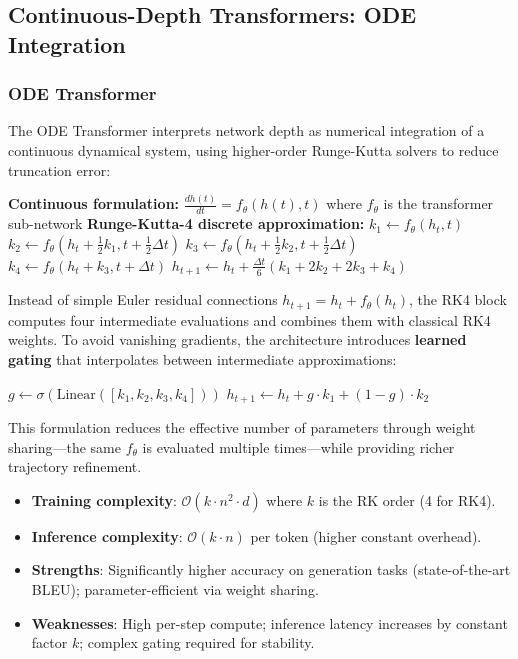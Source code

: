 \subsection{Continuous-Depth Transformers: ODE Integration}

\subsubsection{ODE Transformer}
The ODE Transformer \citep{zhang_continuous_2021} interprets network depth as numerical integration of a continuous dynamical system, using higher-order Runge-Kutta solvers to reduce truncation error:

\begin{algorithmic}[1]
\State \textbf{Continuous formulation:} $\frac{dh(t)}{dt} = f_\theta(h(t), t)$ where $f_\theta$ is the transformer sub-network
\State \textbf{Runge-Kutta-4 discrete approximation:}
\State $k_1 \gets f_\theta(h_t, t)$
\State $k_2 \gets f_\theta(h_t + \tfrac{1}{2}k_1, t + \tfrac{1}{2}\Delta t)$
\State $k_3 \gets f_\theta(h_t + \tfrac{1}{2}k_2, t + \tfrac{1}{2}\Delta t)$
\State $k_4 \gets f_\theta(h_t + k_3, t + \Delta t)$
\State $h_{t+1} \gets h_t + \frac{\Delta t}{6}(k_1 + 2k_2 + 2k_3 + k_4)$ 
\end{algorithmic}

Instead of simple Euler residual connections $h_{t+1} = h_t + f_\theta(h_t)$, the RK4 block computes four intermediate evaluations and combines them with classical RK4 weights. To avoid vanishing gradients, the architecture introduces \textbf{learned gating} that interpolates between intermediate approximations:

\begin{algorithmic}[1]
\State $g \gets \sigma(\text{Linear}([k_1, k_2, k_3, k_4]))$ 
\State $h_{t+1} \gets h_t + g \cdot k_1 + (1-g) \cdot k_2$ 
\end{algorithmic}

This formulation reduces the effective number of parameters through weight sharing---the same $f_\theta$ is evaluated multiple times---while providing richer trajectory refinement.

\begin{itemize}[leftmargin=*]
    \item \textbf{Training complexity}: $\mathcal{O}(k \cdot n^2 \cdot d)$ where $k$ is the RK order (4 for RK4).
    \item \textbf{Inference complexity}: $\mathcal{O}(k \cdot n)$ per token (higher constant overhead).
    \item \textbf{Strengths}: Significantly higher accuracy on generation tasks (state-of-the-art BLEU); parameter-efficient via weight sharing.
    \item \textbf{Weaknesses}: High per-step compute; inference latency increases by constant factor $k$; complex gating required for stability.
\end{itemize}

